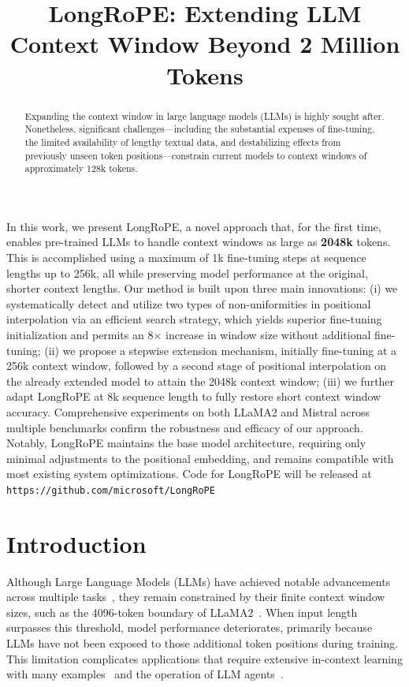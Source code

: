 \title{LongRoPE: Extending LLM Context Window Beyond 2 Million Tokens}

\begin{abstract}
Expanding the context window in large language models (LLMs) is highly sought after. Nonetheless, significant challenges—including the substantial expenses of fine-tuning, the limited availability of lengthy textual data, and destabilizing effects from previously unseen token positions—constrain current models to context windows of approximately 128k tokens.
\end{abstract}

In this work, we present LongRoPE, a novel approach that, for the first time, enables pre-trained LLMs to handle context windows as large as \textbf{2048k} tokens. This is accomplished using a maximum of 1k fine-tuning steps at sequence lengths up to 256k, all while preserving model performance at the original, shorter context lengths. Our method is built upon three main innovations: (i) we systematically detect and utilize two types of non-uniformities in positional interpolation via an efficient search strategy, which yields superior fine-tuning initialization and permits an 8$\times$ increase in window size without additional fine-tuning; (ii) we propose a stepwise extension mechanism, initially fine-tuning at a 256k context window, followed by a second stage of positional interpolation on the already extended model to attain the 2048k context window; (iii) we further adapt LongRoPE at 8k sequence length to fully restore short context window accuracy. Comprehensive experiments on both LLaMA2 and Mistral across multiple benchmarks confirm the robustness and efficacy of our approach. Notably, LongRoPE maintains the base model architecture, requiring only minimal adjustments to the positional embedding, and remains compatible with most existing system optimizations. Code for LongRoPE will be released at \texttt{https://github.com/microsoft/LongRoPE}

\section{Introduction}

Although Large Language Models (LLMs) have achieved notable advancements across multiple tasks~\cite{gpt4,llama2}, they remain constrained by their finite context window sizes, such as the 4096-token boundary of LLaMA2~\cite{llama2}. When input length surpasses this threshold, model performance deteriorates, primarily because LLMs have not been exposed to those additional token positions during training. This limitation complicates applications that require extensive in-context learning with many examples~\cite{Huang2023FewerIM} and the operation of LLM agents~\cite{park2023generative,madaan2023selfrefine}.

